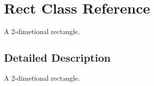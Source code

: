 \hypertarget{class_rect}{\section{Rect Class Reference}
\label{class_rect}
}


A 2-\/dimetional rectangle.  




\subsection{Detailed Description}
A 2-\/dimetional rectangle. 